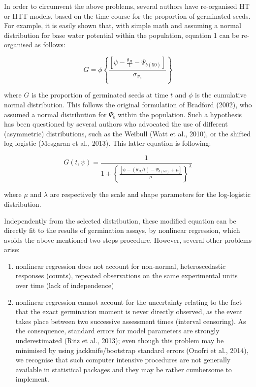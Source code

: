 \documentclass[a4paper,12pt]{article}
\providecommand{\tightlist}{%
	\setlength{\itemsep}{0pt}\setlength{\parskip}{0pt}}
\begin{document}
In order to circumvent the above problems, several authors have
re-organised HT or HTT models, based on the time-course for the
proportion of germinated seeds. For example, it is easily shown that,
with simple math and assuming a normal distribution for base water
potential within the population, equation 1 can be re-organised as
follows:

\begin{equation}
G = \phi \left\{ \frac{ [ \psi - \frac{\theta_{H}} {t} - \Psi_{b(50)} ] } {\sigma_{\Psi_b}} \right\}
\end{equation}

where \(G\) is the proportion of germinated seeds at time \(t\) and
\(\phi\) is the cumulative normal distribution. This follows the
original formulation of Bradford (2002), who assumed a normal
distribution for \(\Psi_b\) within the population. Such a hypothesis has
been questioned by several authors who advocated the use of different
(asymmetric) distributions, such as the Weibull (Watt et al., 2010), or
the shifted log-logistic (Mesgaran et al., 2013). This latter equation
is following:

\begin{equation}
G(t,\psi) = \frac{1}{ 1 + \left\{ \frac{ \left[ \psi - \left( \theta_{H}/ t \right) - \Psi_{b(50)} + \mu \right] } {\mu} \right\} ^ \lambda }
\end{equation}

where \(\mu\) and \(\lambda\) are respectively the scale and shape
parameters for the log-logistic distribution.

Independently from the selected distribution, these modified equation
can be directly fit to the results of germination assays, by nonlinear
regression, which avoids the above mentioned two-steps procedure.
However, several other problems arise:

\begin{enumerate}
\def\labelenumi{\arabic{enumi}.}
\tightlist
\item
  nonlinear regression does not account for non-normal, heteroscedastic
  responses (counts), repeated observations on the same experimental
  units over time (lack of independence)
\item
  nonlinear regression cannot account for the uncertainty relating to
  the fact that the exact germination moment is never directly observed,
  as the event takes place between two successive assessment times
  (interval censoring). As the consequence, standard errors for model
  parameters are strongly underestimated (Ritz et al., 2013); even
  though this problem may be minimised by using jackknife/bootstrap
  standard errors (Onofri et al., 2014), we recognise that such computer
  intensive procedures are not generally available in statistical
  packages and they may be rather cumbersome to implement.
\end{enumerate}
\end{document}
